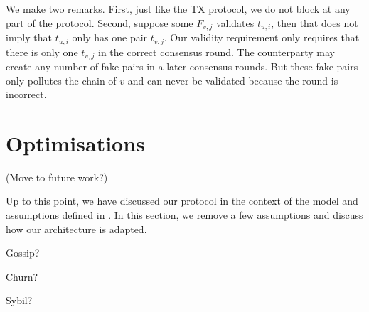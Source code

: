 We make two remarks.
First, just like the TX protocol, we do not block at any part of the protocol.
Second, suppose some $F_{v, j}$ validates $t_{u, i}$, then that does not imply that $t_{u, i}$ only has one pair $t_{v, j}$.
Our validity requirement only requires that there is only one $t_{v, j}$ in the correct consensus round.
The counterparty may create any number of fake pairs in a later consensus rounds.
But these fake pairs only pollutes the chain of $v$ and can never be validated because the round is incorrect.

\section{Optimisations}
\label{sec:optimisations}

(Move to future work?)

Up to this point, we have discussed our protocol in the context of the model and assumptions defined in .
In this section, we remove a few assumptions and discuss how our architecture is adapted.

Gossip?

Churn?

Sybil?



